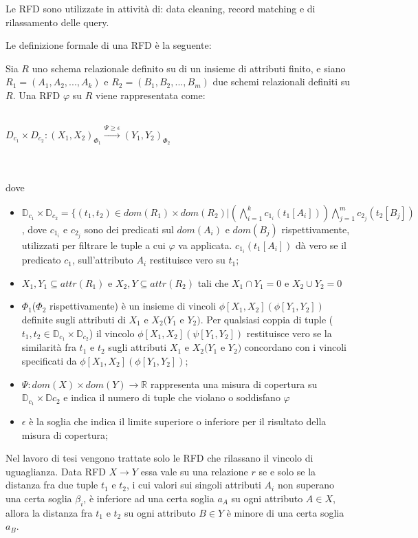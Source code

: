 Le RFD sono utilizzate in attività di:
data cleaning, record matching e di rilassamento delle query.

Le definizione formale di una RFD è la seguente:
\begin{theorem}
Sia $R$ uno schema relazionale definito su di un insieme di attributi finito, e siano $R_1=(A_1,A_2,...,A_k)$ e $R_2=(B_1,B_2,...,B_m)$ due schemi relazionali definiti su $R$. Una RFD $\varphi$ su $R$ viene rappresentata come:
\\~\\
\centerline{$D_{c_1} \times D_{c_2}:(X_1,X_2)_{\Phi_1} \xrightarrow{\Psi\geq\epsilon}(Y_1,Y_2)_{\Phi_2}$}
\\~\\
dove 
\begin{itemize}
\item $\mathbb{D}_{c_1}\times \mathbb{D}_{c_2} = \{(t_1,t_2)\in dom(R_1)\times dom(R_2)|(\bigwedge_{i=1}^{k} c_{1_i}(t_1[A_i])) \bigwedge_{j=1}^{m} c_{2_j}(t_2[B_j])$, dove $c_{1_i}$ e $c_{2_j}$ sono dei predicati sul $dom(A_i)$ e $dom(B_j)$ rispettivamente, utilizzati per filtrare le tuple a cui $\varphi$ va applicata.
$c_{1_i}(t_1[A_i])$ dà vero se il predicato $c_1$, sull'attributo $A_i$ restituisce vero su $t_1$;
\item $X_1,Y_1 \subseteq attr(R_1)$ e $X_2,Y\subseteq attr(R_2)$ tali che $X_1\cap Y_1=0$ e $X_2\cup Y_2=0 $
\item $\Phi_1$($\Phi_2$ rispettivamente) è un insieme di vincoli $\phi[X_1,X_2](\phi[Y_1,Y_2])$ definite sugli attributi di $X_1$ e $X_2(Y_1$ e $Y_2)$. Per qualsiasi coppia di tuple ($t_1,t_2 \in \mathbb{D}_{c_1} \times \mathbb{D}_{c_2}$) il vincolo $\phi[X_1,X_2](\psi[Y_1,Y_2])$ restituisce vero se la similarità fra $t_1$ e $t_2$ sugli attributi $X_1$ e $X_2(Y_1$ e $Y_2)$ concordano con i vincoli specificati da $\phi[X_1,X_2](\phi[Y_1,Y_2])$;
\item $\Psi: dom(X) \times dom(Y)\xrightarrow{}\mathbb{R}$ rappresenta una misura di copertura su $\mathbb{D}_{c_1} \times \mathbb{D}{c_2}$ e indica il numero di tuple che violano o soddisfano $\varphi$
\item $\epsilon$ è la soglia che indica il limite superiore o inferiore per il risultato della misura di copertura;
\end{itemize}
\end{theorem}
Nel lavoro di tesi vengono trattate solo le RFD che rilassano il vincolo di uguaglianza. Data RFD $X \xrightarrow{} Y$ essa vale su una relazione $r$ se e solo se la distanza fra due tuple $t_1$ e $t_2$, i cui valori sui singoli attributi $A_i$ non superano una certa soglia $\beta_i$, è inferiore ad una certa soglia $a_A$ su ogni attributo $A \in X$, allora la distanza fra $t_1$ e $t_2$ su ogni attributo $B \in Y$ è minore di una certa soglia $a_B$.\\
